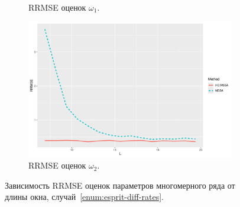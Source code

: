 \documentclass[specialist,
  substylefile=spbu.rtx,
subf,href,colorlinks=true, 12pt]{disser}
\theoremstyle{plain}
\theoremstyle{definition}
\theoremstyle{remark}
\begin{document}
\begin{figure}[!ht]
\begin{subfigure}{0.49\linewidth}
    \caption{RRMSE оценок $\omega_1$.}
    \label{fig:freq1_L}
  \end{subfigure}
  \begin{subfigure}{0.49\linewidth}
    \includegraphics[width=\linewidth]{freq2_L.pdf}
    \caption{RRMSE оценок $\omega_2$.}
    \label{fig:freq2_L}
  \end{subfigure}
  \caption{Зависимость RRMSE оценок параметров многомерного ряда от длины окна,
  случай~\ref{enum:esprit-diff-rates}.}
  \label{fig:L_diff_rates}
\end{figure}



\end{document}
